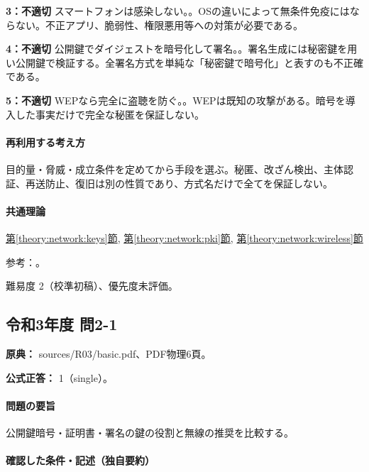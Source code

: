 \noindent\textbf{3：不適切} スマートフォンは感染しない。。OSの違いによって無条件免疫にはならない。不正アプリ、脆弱性、権限悪用等への対策が必要である。\par

\noindent\textbf{4：不適切} 公開鍵でダイジェストを暗号化して署名。。署名生成には秘密鍵を用い公開鍵で検証する。全署名方式を単純な「秘密鍵で暗号化」と表すのも不正確である。\par

\noindent\textbf{5：不適切} WEPなら完全に盗聴を防ぐ。。WEPは既知の攻撃がある。暗号を導入した事実だけで完全な秘匿を保証しない。\par

\paragraph{再利用する考え方} 目的量・脅威・成立条件を定めてから手段を選ぶ。秘匿、改ざん検出、主体認証、再送防止、復旧は別の性質であり、方式名だけで全てを保証しない。

\paragraph{共通理論} \hyperref[theory:network:keys]{第\ref*{theory:network:keys}節}, \hyperref[theory:network:pki]{第\ref*{theory:network:pki}節}, \hyperref[theory:network:wireless]{第\ref*{theory:network:wireless}節}

\par 参考：\cite{net_pki,net_signature,net_wep}。

\par 難易度 2（校準初稿）、優先度未評価。

\subsection{令和3年度 問2-1}
\label{q:r03-reg-basic-2-1}

\noindent\textbf{原典：} sources/R03/basic.pdf、PDF物理6頁。

\textbf{公式正答：} 1（single）。

\paragraph{問題の要旨} 公開鍵暗号・証明書・署名の鍵の役割と無線の推奨を比較する。

\paragraph{確認した条件・記述（独自要約）}\mbox{}\par

